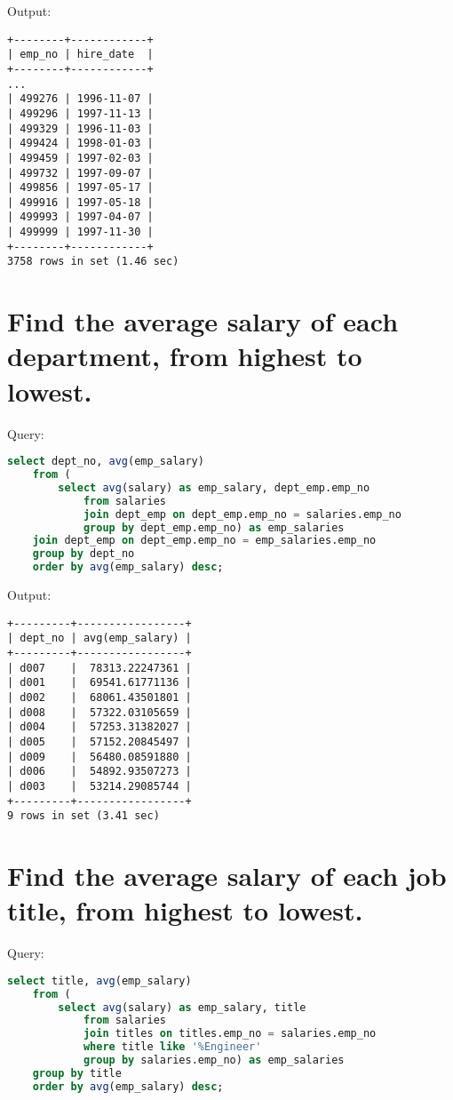 \documentclass[12pt]{article}
\begin{document}
Output:

\begin{verbatim}
+--------+------------+
| emp_no | hire_date  |
+--------+------------+
...
| 499276 | 1996-11-07 |
| 499296 | 1997-11-13 |
| 499329 | 1996-11-03 |
| 499424 | 1998-01-03 |
| 499459 | 1997-02-03 |
| 499732 | 1997-09-07 |
| 499856 | 1997-05-17 |
| 499916 | 1997-05-18 |
| 499993 | 1997-04-07 |
| 499999 | 1997-11-30 |
+--------+------------+
3758 rows in set (1.46 sec)
\end{verbatim}


\section{Find the average salary of each department, from highest to lowest.}

Query:

\begin{lstlisting}[language=SQL]
select dept_no, avg(emp_salary)
    from (
        select avg(salary) as emp_salary, dept_emp.emp_no
            from salaries
            join dept_emp on dept_emp.emp_no = salaries.emp_no
            group by dept_emp.emp_no) as emp_salaries
    join dept_emp on dept_emp.emp_no = emp_salaries.emp_no
    group by dept_no
    order by avg(emp_salary) desc;
\end{lstlisting}

Output:

\begin{verbatim}
+---------+-----------------+
| dept_no | avg(emp_salary) |
+---------+-----------------+
| d007    |  78313.22247361 |
| d001    |  69541.61771136 |
| d002    |  68061.43501801 |
| d008    |  57322.03105659 |
| d004    |  57253.31382027 |
| d005    |  57152.20845497 |
| d009    |  56480.08591880 |
| d006    |  54892.93507273 |
| d003    |  53214.29085744 |
+---------+-----------------+
9 rows in set (3.41 sec)
\end{verbatim}


\section{Find the average salary of each job title, from highest to lowest.}

Query:

\begin{lstlisting}[language=SQL]
select title, avg(emp_salary)
    from (
        select avg(salary) as emp_salary, title
            from salaries
            join titles on titles.emp_no = salaries.emp_no
            where title like '%Engineer'
            group by salaries.emp_no) as emp_salaries
    group by title
    order by avg(emp_salary) desc;
\end{lstlisting}
\end{document}
